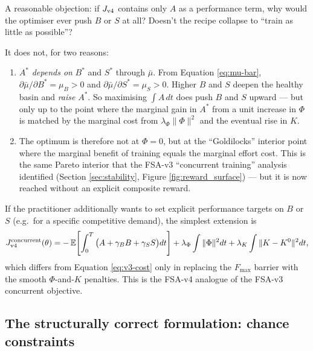 A reasonable objection: if $J_{\rm v4}$ contains only $A$ as a performance term, why would the optimiser ever push $B$ or $S$ at all? Doesn't the recipe collapse to ``train as little as possible''?

It does not, for two reasons:
\begin{enumerate}
  \item $A^*$ \emph{depends on} $B^*$ and $S^*$ through $\bar\mu$. From Equation \ref{eq:mu-bar}, $\partial \bar\mu/\partial B^* = \mu_B > 0$ and $\partial\bar\mu / \partial S^* = \mu_S > 0$. Higher $B$ and $S$ deepen the healthy basin and \emph{raise} $A^*$. So maximising $\int A\, dt$ does push $B$ and $S$ upward --- but only up to the point where the marginal gain in $A^*$ from a unit increase in $\Phi$ is matched by the marginal cost from $\lambda_\Phi \|\Phi\|^2$ and the eventual rise in $K$.
  \item The optimum is therefore not at $\Phi = 0$, but at the ``Goldilocks'' interior point where the marginal benefit of training equals the marginal effort cost. This is the same Pareto interior that the FSA-v3 ``concurrent training'' analysis identified (Section \ref{sec:stability}, Figure \ref{fig:reward_surface}) --- but it is now reached without an explicit composite reward.
\end{enumerate}

If the practitioner additionally wants to set explicit performance targets on $B$ or $S$ (e.g.\ for a specific competitive demand), the simplest extension is
\begin{equation}
J_{\rm v4}^{\rm concurrent}(\theta) = -\,\mathbb{E}\!\left[\int_0^T \big(A + \gamma_B B + \gamma_S S\big) dt\right] + \lambda_\Phi \int \|\Phi\|^2 dt + \lambda_K \int \|K - K^0\|^2 dt,
\label{eq:v4-cost-concurrent}
\end{equation}
which differs from Equation \ref{eq:v3-cost} only in replacing the $F_{\max}$ barrier with the smooth $\Phi$-and-$K$ penalties. This is the FSA-v4 analogue of the FSA-v3 concurrent objective.

\subsection{The structurally correct formulation: chance constraints}

